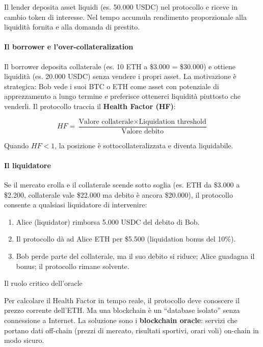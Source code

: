 \documentclass[
  italian,
  openany]{book}
\providecommand{\tightlist}{%
  \setlength{\itemsep}{0pt}\setlength{\parskip}{0pt}}
\begin{document}
Il lender deposita asset liquidi (es. 50.000 USDC) nel protocollo e
riceve in cambio token di interesse. Nel tempo accumula rendimento
proporzionale alla liquidità fornita e alla domanda di prestito.

\paragraph{Il borrower e
l'over-collateralization}\label{il-borrower-e-lover-collateralization}

Il borrower deposita collaterale (es. 10 ETH a \$3.000 = \$30.000) e
ottiene liquidità (es. 20.000 USDC) senza vendere i propri asset. La
motivazione è strategica: Bob vede i suoi BTC o ETH come asset con
potenziale di apprezzamento a lungo termine e preferisce ottenerci
liquidità piuttosto che venderli. Il protocollo traccia il
\textbf{Health Factor (HF)}:

\[HF = \frac{\text{Valore collaterale} \times \text{Liquidation threshold}}{\text{Valore debito}}\]

Quando \(HF < 1\), la posizione è sottocollateralizzata e diventa
liquidabile.

\paragraph{Il liquidatore}\label{il-liquidatore}

Se il mercato crolla e il collaterale scende sotto soglia (es. ETH da
\$3.000 a \$2.200, collaterale vale \$22.000 ma debito è ancora
\$20.000), il protocollo consente a qualsiasi liquidatore di
intervenire:

\begin{enumerate}
\def\labelenumi{\arabic{enumi}.}
\tightlist
\item
  Alice (liquidator) rimborsa 5.000 USDC del debito di Bob.
\item
  Il protocollo dà ad Alice ETH per \$5.500 (liquidation bonus del
  10\%).
\item
  Bob perde parte del collaterale, ma il suo debito si riduce; Alice
  guadagna il bonus; il protocollo rimane solvente.
\end{enumerate}

\begin{calloutwarning}{Il ruolo critico dell’oracle}

Per calcolare il Health Factor in tempo reale, il protocollo deve
conoscere il prezzo corrente dell'ETH. Ma una blockchain è un ``database
isolato'' senza connessione a Internet. La soluzione sono i
\textbf{blockchain oracle}: servizi che portano dati off-chain (prezzi
di mercato, risultati sportivi, orari voli) on-chain in modo sicuro.

\end{calloutwarning}
\end{document}
